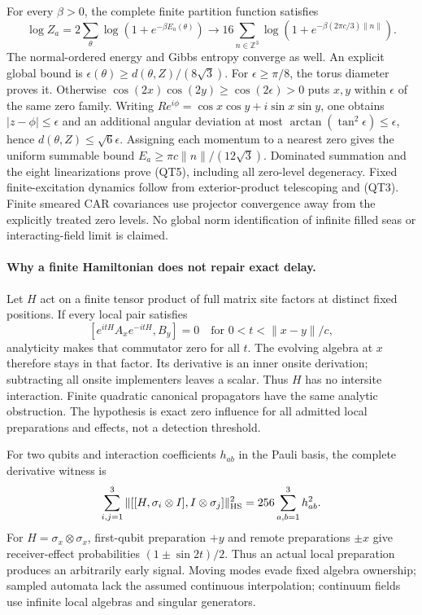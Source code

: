 For every $\beta>0$, the complete finite partition function satisfies
\[
 \log Z_a=2\sum_\theta\log(1+e^{-\beta E_a(\theta)})
 \longrightarrow
 16\sum_{n\in\mathbb Z^3}
       \log(1+e^{-\beta(2\pi c/3)\|n\|}).
 \tag{QT5}
\]
The normal-ordered energy and Gibbs entropy converge as well. An explicit
global bound is $\epsilon(\theta)\geq d(\theta,Z)/(8\sqrt3)$.
For $\epsilon\geq\pi/8$, the torus diameter proves it. Otherwise
$\cos(2x)\cos(2y)\geq\cos(2\epsilon)>0$ puts $x,y$ within
$\epsilon$ of the same zero family. Writing
$R e^{i\phi}=\cos x\cos y+i\sin x\sin y$, one obtains
$|z-\phi|\leq\epsilon$ and an additional angular deviation at most
$\arctan(\tan^2\epsilon)\leq\epsilon$, hence
$d(\theta,Z)\leq\sqrt6\epsilon$.
Assigning each momentum to a nearest zero gives the uniform summable bound
$E_a\geq\pi c\|n\|/(12\sqrt3)$. Dominated summation and the eight
linearizations prove (QT5), including all zero-level degeneracy.
Fixed finite-excitation dynamics follow from exterior-product telescoping
and (QT3). Finite smeared CAR covariances use projector convergence away
from the explicitly treated zero levels. No global norm identification of
infinite filled seas or interacting-field limit is claimed.

\paragraph{Why a finite Hamiltonian does not repair exact delay.}
Let $H$ act on a finite tensor product of full matrix site factors at
distinct fixed positions. If every local pair satisfies
\[
 [e^{itH}A_xe^{-itH},B_y]=0\quad\text{for }0<t<\|x-y\|/c,
 \tag{QT6}
\]
analyticity makes that commutator zero for all $t$. The evolving algebra
at $x$ therefore stays in that factor. Its derivative is an inner onsite
derivation; subtracting all onsite implementers leaves a scalar. Thus
$H$ has no intersite interaction. Finite quadratic canonical propagators
have the same analytic obstruction. The hypothesis is exact zero influence
for all admitted local preparations and effects, not a detection threshold.

For two qubits and interaction coefficients $h_{ab}$ in the Pauli basis,
the complete derivative witness is
\[
 \sum_{i,j=1}^3
 \|[[H,\sigma_i\otimes I],I\otimes\sigma_j]\|_{\rm HS}^2
 =256\sum_{a,b=1}^3h_{ab}^2.
\]
For $H=\sigma_x\otimes\sigma_x$, first-qubit preparation $+y$ and
remote preparations $\pm x$ give receiver-effect probabilities
$(1\pm\sin2t)/2$. Thus an actual local preparation produces an
arbitrarily early signal. Moving modes evade fixed algebra ownership;
sampled automata lack the assumed continuous interpolation; continuum
fields use infinite local algebras and singular generators.

